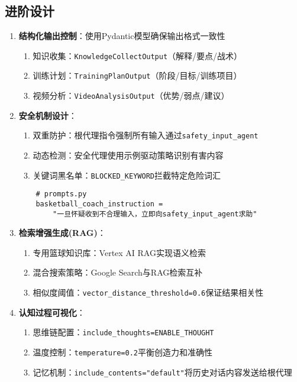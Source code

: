 \documentclass{article}
\theoremstyle{plain}
\theoremstyle{definition}
\theoremstyle{remark}
\begin{document}
\subsection{进阶设计}
\begin{enumerate}
    \item \textbf{结构化输出控制}：使用Pydantic模型确保输出格式一致性
    \begin{enumerate}
        \item 知识收集：\texttt{KnowledgeCollectOutput}（解释/要点/战术）
        \item 训练计划：\texttt{TrainingPlanOutput}（阶段/目标/训练项目）
        \item 视频分析：\texttt{VideoAnalysisOutput}（优势/弱点/建议）
    \end{enumerate}
    
    \item \textbf{安全机制设计}：
    \begin{enumerate}
        \item 双重防护：根代理指令强制所有输入通过\texttt{safety\_input\_agent}
        \item 动态检测：安全代理使用示例驱动策略识别有害内容
        \item 关键词黑名单：\texttt{BLOCKED\_KEYWORD}拦截特定危险词汇
    \end{enumerate}
    \begin{verbatim}
    # prompts.py
    basketball_coach_instruction = 
        "一旦怀疑收到不合理输入，立即向safety_input_agent求助"
    \end{verbatim}
    
    \item \textbf{检索增强生成(RAG)}：
    \begin{enumerate}
        \item 专用篮球知识库：Vertex AI RAG实现语义检索
        \item 混合搜索策略：Google Search与RAG检索互补
        \item 相似度阈值：\texttt{vector\_distance\_threshold=0.6}保证结果相关性
    \end{enumerate}
    
    \item \textbf{认知过程可视化}：
    \begin{enumerate}
        \item 思维链配置：\texttt{include\_thoughts=ENABLE\_THOUGHT}
        \item 温度控制：\texttt{temperature=0.2}平衡创造力和准确性
        \item 记忆机制：\texttt{include\_contents="default"}将历史对话内容发送给根代理
    \end{enumerate}
\end{enumerate}
\end{document}

